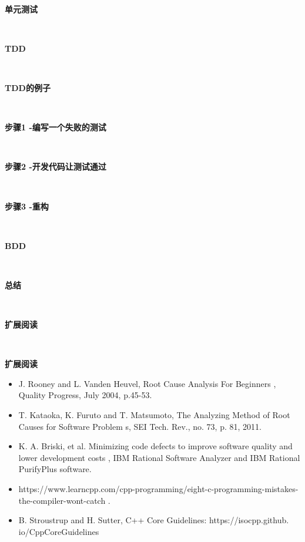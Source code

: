 \noindent\textbf{}\ \par
\textbf{单元测试} \ \par

\noindent\textbf{}\ \par
\textbf{TDD} \ \par

\noindent\textbf{}\ \par
\textbf{TDD的例子} \ \par

\noindent\textbf{}\ \par
\textbf{步骤1 -编写一个失败的测试} \ \par

\noindent\textbf{}\ \par
\textbf{步骤2 -开发代码让测试通过} \ \par

\noindent\textbf{}\ \par
\textbf{步骤3 -重构} \ \par

\noindent\textbf{}\ \par
\textbf{BDD} \ \par

\noindent\textbf{}\ \par
\textbf{总结} \ \par


\noindent\textbf{}\ \par
\textbf{扩展阅读} \ \par

\noindent\textbf{}\ \par
\textbf{扩展阅读} \ \par
\begin{itemize}
	\item J. Rooney and L. Vanden Heuvel,  Root Cause Analysis For Beginners , Quality Progress, July 2004, p.45-53.
	\item T. Kataoka, K. Furuto and T. Matsumoto,  The Analyzing Method of Root Causes for Software Problem s, SEI Tech. Rev., no. 73, p. 81, 2011.
	\item K. A. Briski, et al.  Minimizing code defects to improve software quality and lower development costs , IBM Rational Software Analyzer and IBM	Rational PurifyPlus software.
	\item https://www.learncpp.com/cpp-programming/eight-c-programming-mistakes-the-compiler-wont-catch .
	\item B. Stroustrup and H. Sutter, C++ Core Guidelines:  https:/​/​isocpp.​github.​io/CppCoreGuidelines 
\end{itemize}

